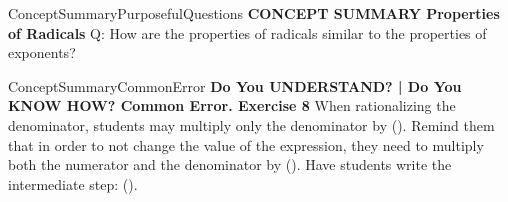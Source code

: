 \documentclass{article}
\newenvironment{te-addendum}[2]{}{}     %
\newcommand{\answer}[1]{}               %
\newcommand{\te}[1]{}                   %
\begin{document}
\begin{te-addendum}{ConceptSummary}{PurposefulQuestions}
\textbf{CONCEPT SUMMARY Properties of Radicals}
Q: How are the properties of radicals similar to the properties of exponents?
\answer{The Product Property of Radicals and the Product Property of Exponents both allow you to distribute the radical or exponent to both factors in a product. The Quotient Property of Radicals and the Quotient Product of Exponents both allow you to distribute the exponent or radical to both the dividend and the divisor in a quotient.}
\te{Printed Quotient Product; likely Quotient Property.}
\end{te-addendum}
\begin{te-addendum}{ConceptSummary}{CommonError}
\textbf{Do You UNDERSTAND? | Do You KNOW HOW? Common Error. Exercise 8}
When rationalizing the denominator, students may multiply only the denominator by (). Remind them that in order to not change the value of the expression, they need to multiply both the numerator and the denominator by (). Have students write the intermediate step: ().
\end{te-addendum}
\end{document}
